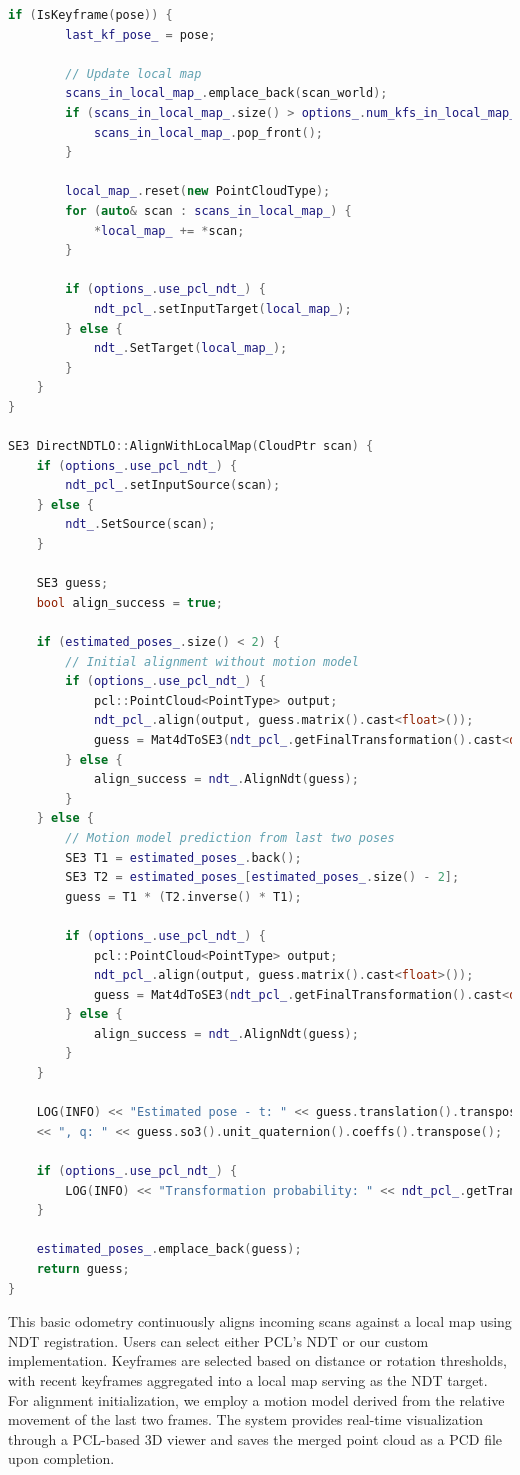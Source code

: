\begin{lstlisting}[language=c++, caption=src/ch7/direct\_ndt\_lo.cc]
	if (IsKeyframe(pose)) {
		last_kf_pose_ = pose;
		
		// Update local map
		scans_in_local_map_.emplace_back(scan_world);
		if (scans_in_local_map_.size() > options_.num_kfs_in_local_map_) {
			scans_in_local_map_.pop_front();
		}
		
		local_map_.reset(new PointCloudType);
		for (auto& scan : scans_in_local_map_) {
			*local_map_ += *scan;
		}
		
		if (options_.use_pcl_ndt_) {
			ndt_pcl_.setInputTarget(local_map_);
		} else {
			ndt_.SetTarget(local_map_);
		}
	}
}

SE3 DirectNDTLO::AlignWithLocalMap(CloudPtr scan) {
	if (options_.use_pcl_ndt_) {
		ndt_pcl_.setInputSource(scan);
	} else {
		ndt_.SetSource(scan);
	}
	
	SE3 guess;
	bool align_success = true;
	
	if (estimated_poses_.size() < 2) {
		// Initial alignment without motion model
		if (options_.use_pcl_ndt_) {
			pcl::PointCloud<PointType> output;
			ndt_pcl_.align(output, guess.matrix().cast<float>());
			guess = Mat4dToSE3(ndt_pcl_.getFinalTransformation().cast<double>());
		} else {
			align_success = ndt_.AlignNdt(guess);
		}
	} else {
		// Motion model prediction from last two poses
		SE3 T1 = estimated_poses_.back();
		SE3 T2 = estimated_poses_[estimated_poses_.size() - 2];
		guess = T1 * (T2.inverse() * T1);
		
		if (options_.use_pcl_ndt_) {
			pcl::PointCloud<PointType> output;
			ndt_pcl_.align(output, guess.matrix().cast<float>());
			guess = Mat4dToSE3(ndt_pcl_.getFinalTransformation().cast<double>());
		} else {
			align_success = ndt_.AlignNdt(guess);
		}
	}
	
	LOG(INFO) << "Estimated pose - t: " << guess.translation().transpose() 
	<< ", q: " << guess.so3().unit_quaternion().coeffs().transpose();
	
	if (options_.use_pcl_ndt_) {
		LOG(INFO) << "Transformation probability: " << ndt_pcl_.getTransformationProbability();
	}
	
	estimated_poses_.emplace_back(guess);
	return guess;
}
\end{lstlisting}

This basic odometry continuously aligns incoming scans against a local map using NDT registration. Users can select either PCL's NDT or our custom implementation. Keyframes are selected based on distance or rotation thresholds, with recent keyframes aggregated into a local map serving as the NDT target. For alignment initialization, we employ a motion model derived from the relative movement of the last two frames. The system provides real-time visualization through a PCL-based 3D viewer and saves the merged point cloud as a PCD file upon completion.

